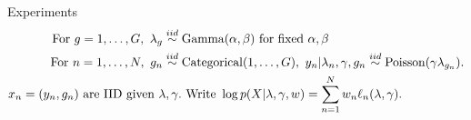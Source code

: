 
\begin{frame}{Experiments}
    \begin{align*}
    \textrm{For }g=1,\ldots,G,\textrm{ }
        \lambda_g \overset{iid}{\sim}{}& \mathrm{Gamma}(\alpha, \beta) \textrm{ for fixed }\alpha,\beta\\
    \textrm{For }n = 1,\ldots,N,\textrm{ }
        g_n \overset{iid}{\sim}{}& \mathrm{Categorical}(1,\ldots,G),\textrm{ }
        y_n | \lambda_n, \gamma, g_n \overset{iid}{\sim}{}
            \mathrm{Poisson}(\gamma \lambda_{g_n}).\\
    x_n ={} (y_n, g_n)
    \textrm{ are IID given } \lambda, \gamma. &
    \textrm{   Write }\log p(X \vert \lambda, \gamma, w) =
       \sum_{n=1}^N w_n \ell_n(\lambda, \gamma).
    \end{align*}
    
    \pause
    
    \HighDimAccuracyGraph{}
    
\end{frame}
        
    


